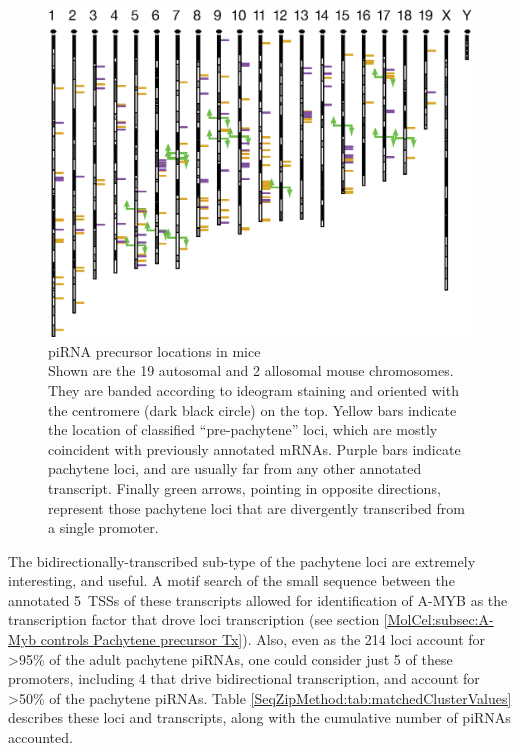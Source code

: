     \begin{figure} %
      \centering 
      \includegraphics{Figures/SeqZipMethod/PrecursorLocations.eps}
      \caption[Pachytene piRNA precursor locations in mice]
      {
        piRNA precursor locations in mice\\[0.25cm]
        Shown are the 19 autosomal and 2 allosomal mouse chromosomes. They are banded according to ideogram staining and oriented with the centromere (dark black circle) on the top. Yellow bars indicate the location of classified ``pre-pachytene'' loci, which are mostly coincident with previously annotated mRNAs. Purple bars indicate pachytene loci, and are usually far from any other annotated transcript. Finally green arrows, pointing in opposite directions, represent those pachytene loci that are divergently transcribed from a single promoter.
     	 }
      \label{SeqZipMethod:fig:precursor Loci Locations}
      \end{figure}

    The bidirectionally-transcribed sub-type of the pachytene loci are extremely interesting, and useful. A motif search of the small sequence between the annotated 5\textprime~TSSs of these transcripts allowed for identification of A-MYB as the transcription factor that drove loci transcription (see section \ref{MolCel:subsec:A-Myb controls Pachytene precursor Tx}). Also, even as the 214 loci account for >95\% of the adult pachytene piRNAs, one could consider just 5 of these promoters, including 4 that drive bidirectional transcription, and account for >50\% of the pachytene piRNAs. Table \ref{SeqZipMethod:tab:matchedClusterValues} describes these loci and transcripts, along with the cumulative number of piRNAs accounted.

